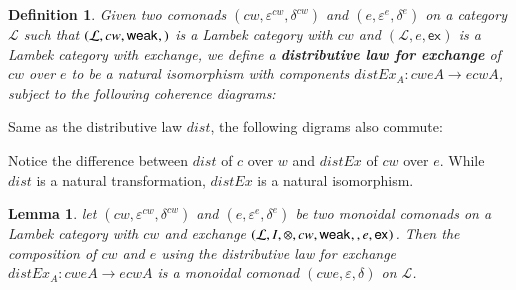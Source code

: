 \documentclass{article}
\newtheorem{lemma}[theorem]{Lemma}
\newtheorem{definition}[theorem]{Definition}
\let\mto\to
\let\to\relax
\newcommand{\to}{\rightarrow}
\let\c\relax
\newcommand{\cat}[1]{\mathcal{#1}}
\newcommand{\w}[1]{\mathsf{weak}_{#1}}
\newcommand{\c}[1]{\mathsf{contra}_{#1}}
\newcommand{\e}[1]{\mathsf{ex}_{#1}}
\begin{document}
\begin{definition}
  \label{def:distEx}
  Given two comonads $(cw,\varepsilon^{cw},\delta^{cw})$ and
  $(e,\varepsilon^e,\delta^e)$ on a category $\cat{L}$ such that
  $(\cat{L},cw,\w{},\c{})$ is a Lambek category with $cw$ and
  $(\cat{L},e,\e{})$ is a Lambek category with exchange, we define a
  \textbf{distributive law for exchange} of $cw$ over $e$ to be a natural
  isomorphism with components $distEx_A:cweA\mto ecwA$, subject to the
  following coherence diagrams:
\end{definition}
Same as the distributive law $dist$, the following digrams also commute:

Notice the difference between $dist$ of $c$ over $w$ and $distEx$ of $cw$
over $e$. While $dist$ is a natural transformation, $distEx$ is a natural
isomorphism.


\begin{lemma}
  \label{lem:compose-cwe}
  let $(cw,\varepsilon^{cw},\delta^{cw})$ and $(e,\varepsilon^e,\delta^e)$
  be two monoidal comonads on a Lambek category with $cw$ and exchange
  $(\cat{L},I,\otimes,cw,\w{},\c{},e,\e{})$. Then the composition of $cw$
  and $e$ using the distributive law for exchange $distEx_A:cweA\mto ecwA$
  is a monoidal comonad $(cwe,\varepsilon,\delta)$ on $\cat{L}$.
\end{lemma}
\end{document}
